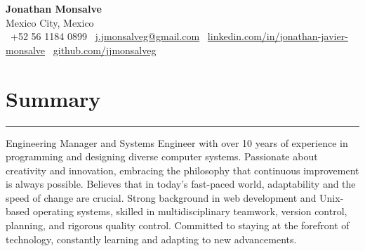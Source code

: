 \documentclass[a4paper,10pt]{article}
\begin{document}
\begin{center}
	\textbf{\LARGE Jonathan Monsalve} \\[0.5em]
	Mexico City, Mexico \\
	\faPhone \ +52 56 1184 0899 \hspace{1em}
	\faEnvelope \ \href{mailto:j.jmonsalveg@gmail.com}{j.jmonsalveg@gmail.com} \hspace{1em}
	\faLinkedin \ \href{http://linkedin.com/in/jonathan-javier-monsalve}{linkedin.com/in/jonathan-javier-monsalve} \hspace{1em}
	\faGithub \ \href{https://github.com/jjmonsalveg}{github.com/jjmonsalveg}
\end{center}

\vspace{0.5em}

\newcommand{\sectionline}{
	\noindent\rule{\linewidth}{0.4pt}\vspace{0.1em}
}

\section*{Summary}
\sectionline
Engineering Manager and Systems Engineer with over 10 years of experience in
programming and designing diverse computer systems. Passionate about creativity
and innovation, embracing the philosophy that continuous improvement is always
possible. Believes that in today's fast-paced world, adaptability and the speed
of change are crucial. Strong background in web development and Unix-based
operating systems, skilled in multidisciplinary teamwork, version control,
planning, and rigorous quality control. Committed to staying at the forefront of
technology, constantly learning and adapting to new advancements.
\end{document}
